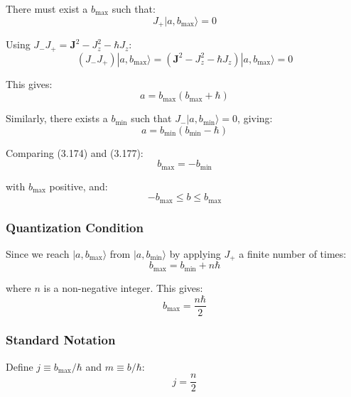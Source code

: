 \documentclass[11pt,a4paper]{article}
\begin{document}
There must exist a $b_{\max}$ such that:
\begin{equation}
J_+|a, b_{\max}\rangle = 0
\tag{3.169}
\end{equation}

Using $J_- J_+ = \mathbf{J}^2 - J_z^2 - \hbar J_z$:
\begin{equation}
(J_- J_+)|a, b_{\max}\rangle = (\mathbf{J}^2 - J_z^2 - \hbar J_z)|a, b_{\max}\rangle = 0
\tag{3.170, 3.171, 3.172}
\end{equation}

This gives:
\begin{equation}
a = b_{\max}(b_{\max} + \hbar)
\tag{3.174}
\end{equation}

Similarly, there exists a $b_{\min}$ such that $J_-|a, b_{\min}\rangle = 0$, giving:
\begin{equation}
a = b_{\min}(b_{\min} - \hbar)
\tag{3.177}
\end{equation}

Comparing (3.174) and (3.177):
\begin{equation}
b_{\max} = -b_{\min}
\tag{3.178}
\end{equation}

with $b_{\max}$ positive, and:
\begin{equation}
-b_{\max} \leq b \leq b_{\max}
\tag{3.179}
\end{equation}

\subsubsection{Quantization Condition}

Since we reach $|a, b_{\max}\rangle$ from $|a, b_{\min}\rangle$ by applying $J_+$ a finite number of times:
\begin{equation}
b_{\max} = b_{\min} + n\hbar
\tag{3.180}
\end{equation}

where $n$ is a non-negative integer. This gives:
\begin{equation}
b_{\max} = \frac{n\hbar}{2}
\tag{3.181}
\end{equation}

\subsubsection{Standard Notation}

Define $j \equiv b_{\max}/\hbar$ and $m \equiv b/\hbar$:
\begin{equation}
j = \frac{n}{2}
\tag{3.182}
\end{equation}
\end{document}
